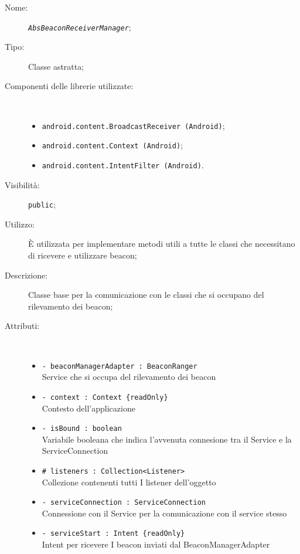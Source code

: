 \documentclass[../DefinizioneDiProdotto.tex]{subfiles}
\begin{document}
\begin{description}
	\item[Nome:] \texttt{\textit{AbsBeaconReceiverManager}};
	\item[Tipo:] Classe astratta;
	\item[Componenti delle librerie utilizzate:] \
	\begin{itemize}
		\item \texttt{android.content.BroadcastReceiver (Android)};
		
		\item \texttt{android.content.Context (Android)};
		
		\item \texttt{android.content.IntentFilter (Android)}.
		
	\end{itemize}
	\item[Visibilità:] \texttt{public};
	\item[Utilizzo:] È utilizzata per implementare metodi utili a tutte le classi che necessitano di ricevere e utilizzare beacon;
	\item[Descrizione:] Classe base per la comunicazione con le classi che si occupano del rilevamento dei beacon;
	\item[Attributi:] \
	\begin{itemize}
		\item \texttt{- beaconManagerAdapter : BeaconRanger}\\
		Service che si occupa del rilevamento dei beacon
		
		\item \texttt{- context : Context \{readOnly\}}\\
		Contesto dell'applicazione
		
		\item \texttt{- isBound : boolean}\\
		Variabile booleana che indica l'avvenuta connesione tra il Service e la ServiceConnection
		
		\item \texttt{\# listeners : Collection<Listener>}\\
		Collezione contenenti tutti I listener dell'oggetto
		
		\item \texttt{- serviceConnection : ServiceConnection}\\
		Connessione con il Service per la comunicazione con il service stesso
		
		\item \texttt{- serviceStart : Intent \{readOnly\}}\\
		Intent per ricevere I beacon inviati dal BeaconManagerAdapter
		

\end{itemize}
\end{description}
\end{document}
